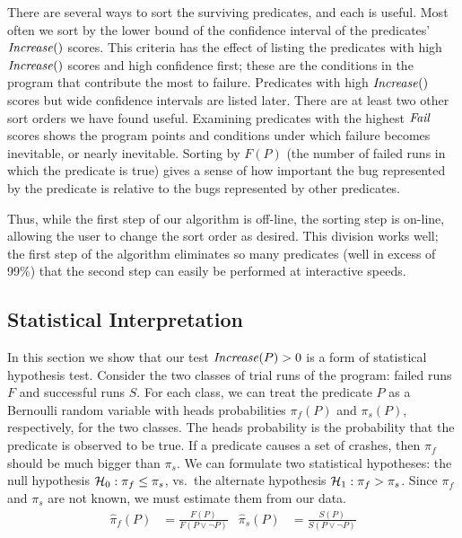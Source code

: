 There are several ways to sort the surviving predicates, and each is useful.
Most often we sort by the lower bound of the confidence interval of the predicates' $\mbox{\textit{Increase}}()$ scores.
This criteria has the effect of listing the predicates with high $\mbox{\textit{Increase}}()$ scores and high
confidence first; these are the conditions in the program that contribute the most to failure.
Predicates with high $\mbox{\textit{Increase}}()$ scores but wide confidence intervals are listed
later.  
There are at least two other sort orders we have found useful.  Examining 
predicates with the highest $\mbox{\textit{Fail}}$ scores shows the program points and conditions under which failure
becomes inevitable, or nearly inevitable.  Sorting by $F(P)$ (the number of failed runs in which the predicate
is true) gives a sense of how important the bug represented by the predicate is relative to the bugs represented
by other predicates. 

Thus, while the first step of our algorithm is off-line, the sorting step is on-line, allowing the user to change
the sort order as desired.  This division works well; the first step of the algorithm eliminates so many predicates
(well in excess of 99\%) that the second step can easily be performed at interactive speeds.

\subsection{Statistical Interpretation}

In this section we show that our test $\mbox{\textit{Increase}}(P) > 0$ is a form of
statistical hypothesis test.  Consider the two classes of trial runs
of the program: failed runs $F$ and successful runs $S$.  For each
class, we can treat the predicate $P$ as a Bernoulli random variable
with heads probabilities $\pi_f(P)$ and $\pi_s(P)$, respectively, for the
two classes.  The heads
probability is the probability that the predicate is observed to be
true.  If a predicate causes a set of crashes, then $\pi_f$ should be
much bigger than $\pi_s$.  We can formulate two statistical hypotheses:
the null hypothesis ${\mathcal{H}}_0:
\pi_f \leq \pi_s$, vs.\ the alternate hypothesis ${\mathcal{H}}_1: \pi_f > \pi_s$.  Since
$\pi_f$ and $\pi_s$ are not known, we must estimate them from our
data.
\begin{align*}
  \hat \pi_f(P) &= \frac{F(P)}{F(P \lor \lnot P)} &
  \hat \pi_s(P) &= \frac{S(P)}{S(P \lor \lnot P)}
\end{align*}

